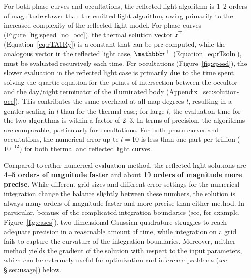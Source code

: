 \documentclass[modern]{aastex62}
\begin{document}
For both phase curves and occultations, the \starry reflected
light algorithm is 1--2 orders of
magnitude slower than the emitted light algorithm, owing
primarily to the increased complexity of the reflected light model.
For phase curves (Figure~\ref{fig:speed_no_occ}),
the thermal solution vector $\mathbf{r}^\top$ (Equation~\ref{eq:rTA1Ry}) is a constant
that can be pre-computed, while the analogous vector in the reflected
light case, $\rT$ (Equation~\ref{eq:rTsoln}), must be evaluated
recursively each time. For occultations (Figure~\ref{fig:speed}),
the slower evaluation in the reflected light case is primarily due to
the time spent solving the quartic equation for the points of intersection
between the occultor and the day/night terminator of the illuminated
body (Appendix~\ref{sec:solution-occ}). This contributes the
same overhead at all map degrees $l$, resulting in a gentler scaling
in $l$ than for the thermal case; for large $l$, the evaluation time
for the two algorithms is within a factor of 2--3.
%
In terms of precision, the algorithms are comparable, particularly
for occultations. For both phase curves and occultations, the numerical error up
to $l=10$ is less than one part per trillion ($10^{-12}$) for both thermal
and reflected light curves.

Compared to either numerical evaluation method, the \starry reflected light
solutions are
\textbf{4--5 orders of magnitude faster} and about
\textbf{10 orders of magnitude more precise}. While different
grid sizes and different error settings for the numerical integration change
the balance slightly between these numbers, the \starry solution is always
many orders of magnitude faster and more precise than either method.
In particular, because of the complicated integration boundaries
(see, for example, Figure~\ref{fig:cases}), two-dimensional Gaussian quadrature
struggles to reach adequate precision in a reasonable amount of time,
while integration on a grid fails to capture the curvature of the
integration boundaries. Moreover, neither method yields the gradient of the
solution with respect to the input parameters, which can be extremely useful
for optimization and inference problems (see \S\ref{sec:usage}) below.
\end{document}
